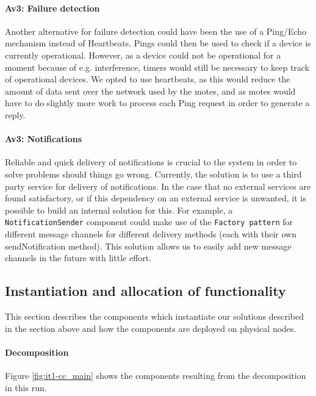         \paragraph{Av3: Failure detection}
            Another alternative for failure detection could have been the use of
            a Ping/Echo mechanism instead of Heartbeats. Pings could then be used
            to check if a device is currently operational. However, as a device could
            not be operational for a moment because of e.g. interference, timers
            would still be necessary to keep track of operational devices. We opted
            to use heartbeats, as this would reduce the amount of data sent over
            the network used by the motes, and as motes would have to do slightly
            more work to process each Ping request in order to generate a reply.

        \paragraph{Av3: Notifications}
            Reliable and quick delivery of notifications is crucial to the
            system in order to solve problems should things go wrong. Currently,
            the solution is to use a third party service for delivery of
            notifications. In the case that no external services are found
            satisfactory, or if this dependency on an external service is
            unwanted, it is possible to build an internal solution for this.
            For example, a \texttt{NotificationSender} component could make use
            of the \texttt{Factory pattern} for different message channels for
            different delivery methods (each with their own sendNotification method).
            This solution allows us to easily add new message channels in the
            future with little effort.


\subsection{Instantiation and allocation of functionality}
    This section describes the components which instantiate our solutions described
    in the section above and how the components are deployed on physical nodes.

    \paragraph{Decomposition}
        Figure \ref{fig:it1-cc_main} shows the components resulting from the
        decomposition in this run.

